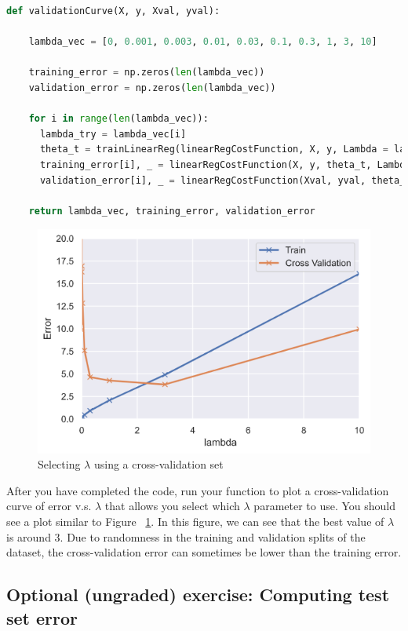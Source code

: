 \documentclass[12pt]{article}
\begin{document}
\begin{lstlisting}[language=Python]
  def validationCurve(X, y, Xval, yval):
    
    lambda_vec = [0, 0.001, 0.003, 0.01, 0.03, 0.1, 0.3, 1, 3, 10]

    training_error = np.zeros(len(lambda_vec))
    validation_error = np.zeros(len(lambda_vec))

    for i in range(len(lambda_vec)):
      lambda_try = lambda_vec[i]
      theta_t = trainLinearReg(linearRegCostFunction, X, y, Lambda = lambda_try)
      training_error[i], _ = linearRegCostFunction(X, y, theta_t, Lambda = 0)
      validation_error[i], _ = linearRegCostFunction(Xval, yval, theta_t, Lambda = 0)

    return lambda_vec, training_error, validation_error
\end{lstlisting}

\begin{figure}[h!]
  \centering
  \includegraphics[scale=0.6]{selectlambda.png}
  \caption{Selecting $\lambda$ using a cross-validation set}
  \label{fig:selectlambda}
\end{figure}

After you have completed the code, run your function to plot a cross-validation curve of error v.s. $\lambda$ that allows you select which $\lambda$ parameter to use. You should see a plot similar to Figure ~\ref{fig:selectlambda}. In this figure, we can see that the best value of $\lambda$ is around 3. Due to randomness in the training and validation splits of the dataset, the cross-validation error can sometimes be lower than the training error.

\subsection{Optional (ungraded) exercise: Computing test set error}
\end{document}
